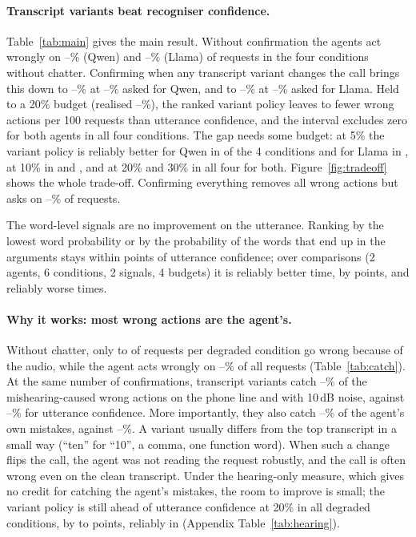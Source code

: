 \documentclass[11pt]{article}
\begin{document}
\paragraph{Transcript variants beat recogniser confidence.} Table~\ref{tab:main} gives the main result. Without confirmation the agents act wrongly on \QwenNeverMin--\QwenNeverMax\% (Qwen) and \LlamaNeverMin--\LlamaNeverMax\% (Llama) of requests in the four conditions without chatter. Confirming when any transcript variant changes the call brings this down to \QwenEitherMin--\QwenEitherMax\% at \QwenAskedMin--\QwenAskedMax\% asked for Qwen, and to \LlamaEitherMin--\LlamaEitherMax\% at \LlamaAskedMin--\LlamaAskedMax\% asked for Llama. Held to a 20\% budget (realised \RealisedMin--\RealisedMax\%), the ranked variant policy leaves \GainMin{} to \GainMax{} fewer wrong actions per 100 requests than utterance confidence, and the interval excludes zero for both agents in all four conditions. The gap needs some budget: at 5\% the variant policy is reliably better for Qwen in \SigFiveQwen{} of the 4 conditions and for Llama in \SigFiveLlama, at 10\% in \SigTenQwen{} and \SigTenLlama, and at 20\% and 30\% in all four for both. Figure~\ref{fig:tradeoff} shows the whole trade-off. Confirming everything removes all wrong actions but asks on \AlwaysMin--\AlwaysMax\% of requests.

The word-level signals are no improvement on the utterance. Ranking by the lowest word probability or by the probability of the words that end up in the arguments stays within \WordMaxAbs{} points of utterance confidence; over \WordN{} comparisons (2 agents, 6 conditions, 2 signals, 4 budgets) it is reliably better \WordBetter{} time, by \WordBetterBy{} points, and reliably worse \WordWorse{} times.

\paragraph{Why it works: most wrong actions are the agent's.} Without chatter, only \HearCausedMin{} to \HearCausedMax{} of \NItems{} requests per degraded condition go wrong because of the audio, while the agent acts wrongly on \AgentWrongMin--\AgentWrongMax\% of all requests (Table~\ref{tab:catch}). At the same number of confirmations, transcript variants catch \CatchHearMin--\CatchHearMax\% of the mishearing-caused wrong actions on the phone line and with 10\,dB noise, against \CatchHearUttMin--\CatchHearUttMax\% for utterance confidence. More importantly, they also catch \CatchAgentMin--\CatchAgentMax\% of the agent's own mistakes, against \CatchAgentUttMin--\CatchAgentUttMax\%. A variant usually differs from the top transcript in a small way (``ten'' for ``10'', a comma, one function word). When such a change flips the call, the agent was not reading the request robustly, and the call is often wrong even on the clean transcript. Under the hearing-only measure, which gives no credit for catching the agent's mistakes, the room to improve is small; the variant policy is still ahead of utterance confidence at 20\% in all \HearN{} degraded conditions, by \HearDiffMin{} to \HearDiffMax{} points, reliably in \HearSig{} (Appendix Table~\ref{tab:hearing}).
\end{document}
